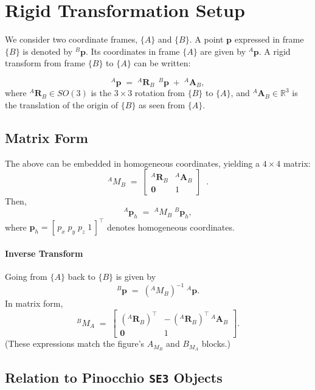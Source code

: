 \documentclass[10pt]{article}
\begin{document}
\section*{Rigid Transformation Setup}

We consider two coordinate frames, \(\{A\}\) and \(\{B\}\). A point \(\mathbf{p}\) expressed in frame \(\{B\}\) is denoted by \( {}^{B}\mathbf{p}\).  Its coordinates in frame \(\{A\}\) are given by \( {}^{A}\mathbf{p}\).  A rigid transform from frame \(\{B\}\) to \(\{A\}\) can be written:

\[
{}^{A}\mathbf{p} \;=\;
{}^{A}\mathbf{R}_{B}\;\, {}^{B}\mathbf{p}
\;+\;
{}^{A}\mathbf{A}_{B},
\]
where \( {}^{A}\mathbf{R}_{B} \in SO(3)\) is the \(3 \times 3\) rotation from \(\{B\}\) to \(\{A\}\), and \( {}^{A}\mathbf{A}_{B}\in \mathbb{R}^{3}\) is the translation of the origin of \(\{B\}\) as seen from \(\{A\}\).

\subsection*{Matrix Form}
The above can be embedded in homogeneous coordinates, yielding a \(4\times 4\) matrix:
\[
{}^{A}\!M_{B}
\;=\;
\begin{bmatrix}
{}^{A}\mathbf{R}_{B} & {}^{A}\mathbf{A}_{B}\\[6pt]
\mathbf{0} & 1
\end{bmatrix}
\;\;.
\]
Then,
\[
{}^{A}\mathbf{p}_{h} 
\;=\;
{}^{A}\!M_{B}
\; {}^{B}\mathbf{p}_{h},
\]
where \(\mathbf{p}_{h} = [\,p_x \; p_y \; p_z \; 1\,]^\top\) denotes homogeneous coordinates.

\paragraph{Inverse Transform}
Going from \(\{A\}\) back to \(\{B\}\) is given by
\[
{}^{B}\mathbf{p}
\;=\;
({}^{A}\!M_{B})^{-1} \; {}^{A}\mathbf{p}.
\]
In matrix form,
\[
{}^{B}\!M_{A}
\;=\;
\begin{bmatrix}
({}^{A}\mathbf{R}_{B})^\top & -\,({}^{A}\mathbf{R}_{B})^\top\, {}^{A}\mathbf{A}_{B}\\[2pt]
\mathbf{0} & 1
\end{bmatrix}.
\]
(These expressions match the figure’s \({A}_{M_B}\) and \({B}_{M_A}\) blocks.)

\subsection*{Relation to Pinocchio \texttt{SE3} Objects}
\end{document}
